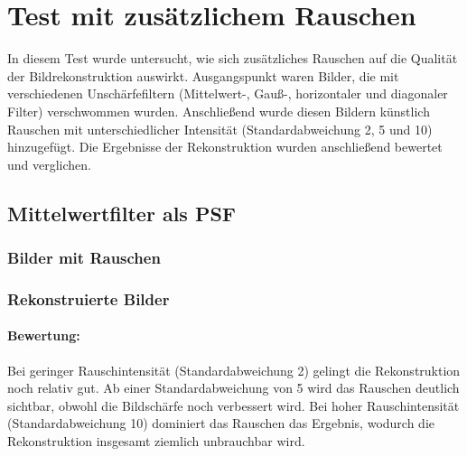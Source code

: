 \section{Test mit zusätzlichem Rauschen}

In diesem Test wurde untersucht, wie sich zusätzliches Rauschen auf die Qualität der Bildrekonstruktion auswirkt. Ausgangspunkt waren Bilder, die mit verschiedenen Unschärfefiltern (Mittelwert-, Gauß-, horizontaler und diagonaler Filter) verschwommen wurden. Anschließend wurde diesen Bildern künstlich Rauschen mit unterschiedlicher Intensität (Standardabweichung 2, 5 und 10) hinzugefügt. Die Ergebnisse der Rekonstruktion wurden anschließend bewertet und verglichen.

\newpage
\subsection{Mittelwertfilter als PSF}

\subsubsection{Bilder mit Rauschen}

\noindent
\begin{minipage}[t]{0.33\textwidth}
\end{minipage}
%
\begin{minipage}[t]{0.33\textwidth}
\end{minipage}
%
\begin{minipage}[t]{0.33\textwidth}
\end{minipage}

\subsubsection{Rekonstruierte Bilder}

\paragraph{Bewertung:}
Bei geringer Rauschintensität (Standardabweichung 2) gelingt die Rekonstruktion noch relativ gut. Ab einer Standardabweichung von 5 wird das Rauschen deutlich sichtbar, obwohl die Bildschärfe noch verbessert wird. Bei hoher Rauschintensität (Standardabweichung 10) dominiert das Rauschen das Ergebnis, wodurch die Rekonstruktion insgesamt ziemlich unbrauchbar wird.

